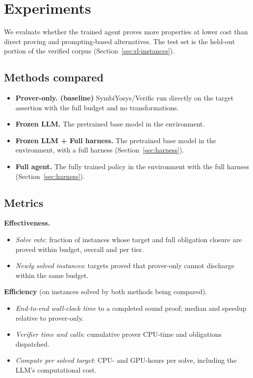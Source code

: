 \section{Experiments}
\label{sec:experiments}

We evaluate whether the trained agent proves more properties at lower cost
than direct proving and prompting-based alternatives.
The test set is the held-out portion of the verified corpus (Section~\ref{sec:rl-instances}).

\subsection{Methods compared}
\label{sec:exp-methods}

\begin{itemize}[nosep]
    \item \textbf{Prover-only. (baseline)} SymbiYosys/Verific run directly on the target assertion with the full budget and no transformations.
    \item \textbf{Frozen LLM.} The pretrained base model in the environment.
    \item \textbf{Frozen LLM + Full harness.} The pretrained base model in the environment, with a full harness (Section~\ref{sec:harness}).
    \item \textbf{Full agent.} The fully trained policy in the environment with the full harness (Section~\ref{sec:harness}).
\end{itemize}

\subsection{Metrics}
\label{sec:exp-metrics}

\textbf{Effectiveness.}
\begin{itemize}[nosep]
    \item \emph{Solve rate}: fraction of instances whose target and full
    obligation closure are proved within budget, overall and per tier.
    \item \emph{Newly solved instances}: targets proved that prover-only
    cannot discharge within the same budget.
\end{itemize}

\textbf{Efficiency} (on instances solved by both methods being compared).
\begin{itemize}[nosep]
    \item \emph{End-to-end wall-clock time} to a completed sound proof;
    median and speedup relative to prover-only.
    \item \emph{Verifier time and calls}: cumulative prover CPU-time and
    obligations dispatched.
    \item \emph{Compute per solved target}: CPU- and GPU-hours per solve,
    including the LLM's computational cost.
\end{itemize}

